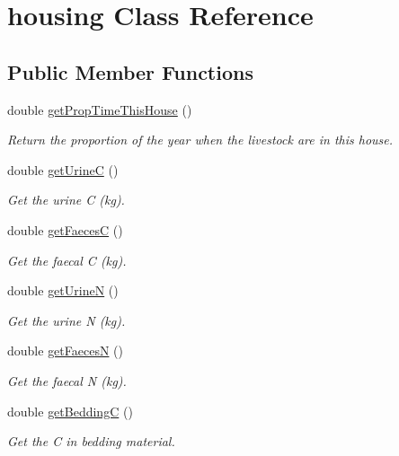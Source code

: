\hypertarget{classhousing}{}\section{housing Class Reference}
\label{classhousing}
\subsection*{Public Member Functions}
\begin{DoxyCompactItemize}
\item 
double \mbox{\hyperlink{classhousing_adc0b218cb4e93ed542c55d09979d0dc0}{get\+Prop\+Time\+This\+House}} ()
\begin{DoxyCompactList}\small\item\em Return the proportion of the year when the livestock are in this house. \end{DoxyCompactList}\item 
double \mbox{\hyperlink{classhousing_a03f1a9f603529c9110bb7847bcddcd48}{get\+UrineC}} ()
\begin{DoxyCompactList}\small\item\em Get the urine C (kg). \end{DoxyCompactList}\item 
double \mbox{\hyperlink{classhousing_ac3deab93a70d3d7c05439aee7f1bcc2e}{get\+FaecesC}} ()
\begin{DoxyCompactList}\small\item\em Get the faecal C (kg). \end{DoxyCompactList}\item 
double \mbox{\hyperlink{classhousing_a9df8ddec2d15e3b64ad8819b03a71261}{get\+UrineN}} ()
\begin{DoxyCompactList}\small\item\em Get the urine N (kg). \end{DoxyCompactList}\item 
double \mbox{\hyperlink{classhousing_ae77b6199b98972e871a376aaeaf59bcd}{get\+FaecesN}} ()
\begin{DoxyCompactList}\small\item\em Get the faecal N (kg). \end{DoxyCompactList}\item 
double \mbox{\hyperlink{classhousing_a75970a10d0af75df797cd4bb98c8c058}{get\+BeddingC}} ()
\begin{DoxyCompactList}\small\item\em Get the C in bedding material. \end{DoxyCompactList}\item 

\end{DoxyCompactItemize}
